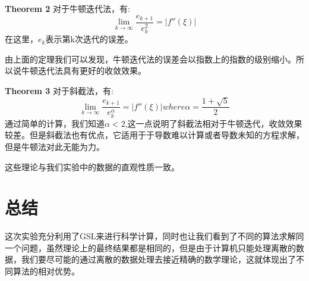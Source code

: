 \documentclass{ctexart}
\begin{document}
\textbf{Theorem 2}{} 对于牛顿迭代法，有:
\begin{equation}
   \lim_{k \to \infty} \frac{e_{k+1}}{e_k^2} = |f''(\xi)|
\end{equation}
在这里，$e_k$表示第k次迭代的误差。\par
由上面的定理我们可以发现，牛顿迭代法的误差会以指数上的指数的级别缩小。所以说牛顿迭代法具有更好的收敛效果。\par
\textbf{Theorem 3}{} 对于斜截法，有:
\begin{equation}
   \lim_{k \to \infty} \frac{e_{k+1}}{e_k^{\alpha}} = |f''(\xi)|
   where \alpha=\frac{1+\sqrt{5}}{2}
\end{equation}
通过简单的计算，我们知道$\alpha < 2$,这一点说明了斜截法相对于牛顿迭代，收敛效果较差。但是斜截法也有优点，它适用于于导数难以计算或者导数未知的方程求解，但是牛顿法对此无能为力。\par
这些理论与我们实验中的数据的直观性质一致。
\section{总结}
这次实验充分利用了GSL来进行科学计算，同时也让我们看到了不同的算法求解同一个问题，虽然理论上的最终结果都是相同的，但是由于计算机只能处理离散的数据，我们要尽可能的通过离散的数据处理去接近精确的数学理论，这就体现出了不同算法的相对优势。
\end{document}

